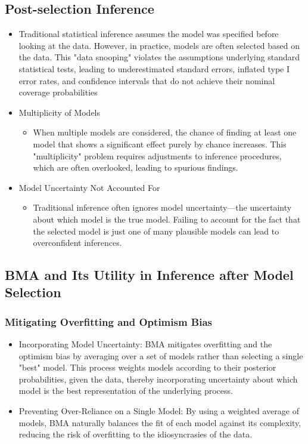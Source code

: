 \documentclass{article}
\begin{document}
\subsection{Post-selection Inference}
\begin{itemize}
    \item Traditional statistical inference assumes the model was specified before looking at the data. However, in practice, models are often selected based on the data. This "data snooping" violates the assumptions underlying standard statistical tests, leading to underestimated standard errors, inflated type I error rates, and confidence intervals that do not achieve their nominal coverage probabilities
    \item Multiplicity of Models
    \begin{itemize}
        \item When multiple models are considered, the chance of finding at least one model that shows a significant effect purely by chance increases. This "multiplicity" problem requires adjustments to inference procedures, which are often overlooked, leading to spurious findings.
    \end{itemize}
    \item Model Uncertainty Not Accounted For
    \begin{itemize}
        \item Traditional inference often ignores model uncertainty—the uncertainty about which model is the true model. Failing to account for the fact that the selected model is just one of many plausible models can lead to overconfident inferences.
    \end{itemize}
\end{itemize}

\subsection{BMA and Its Utility in Inference after Model Selection}

\subsubsection{Mitigating Overfitting and Optimism Bias}
\begin{itemize}
    \item Incorporating Model Uncertainty: BMA mitigates overfitting and the optimism bias by averaging over a set of models rather than selecting a single "best" model. This process weights models according to their posterior probabilities, given the data, thereby incorporating uncertainty about which model is the best representation of the underlying process.
    \item Preventing Over-Reliance on a Single Model: By using a weighted average of models, BMA naturally balances the fit of each model against its complexity, reducing the risk of overfitting to the idiosyncrasies of the data.
\end{itemize}
\end{document}
